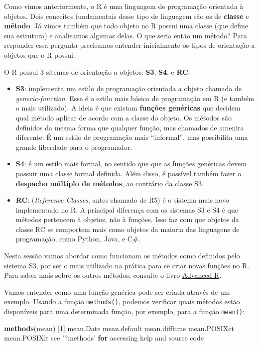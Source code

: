 \documentclass[10pt,a4paper]{book}
\newenvironment{Shaded}{\begin{snugshade}}{\end{snugshade}}
\newcommand{\KeywordTok}[1]{\textcolor[rgb]{0.13,0.29,0.53}{\textbf{#1}}}
\newcommand{\DecValTok}[1]{\textcolor[rgb]{0.00,0.00,0.81}{#1}}
\newcommand{\StringTok}[1]{\textcolor[rgb]{0.31,0.60,0.02}{#1}}
\newcommand{\ControlFlowTok}[1]{\textcolor[rgb]{0.13,0.29,0.53}{\textbf{#1}}}
\newcommand{\NormalTok}[1]{#1}
\providecommand{\tightlist}{%
  \setlength{\itemsep}{0pt}\setlength{\parskip}{0pt}}
\begin{document}
Como vimos anteriormente, o R é uma linguagem de programação orientada à
objetos. Dois conceitos fundamentais desse tipo de linguagem são os de
\textbf{classe} e \textbf{método}. Já vimos também que todo objeto no R
possui uma classe (que define sua estrutura) e analisamos algumas delas.
O que seria então um método? Para responder essa pergunta precisamos
entender inicialmente os tipos de orientação a objetos que o R possui.

O R possui 3 sitemas de orientação a objetos: \textbf{S3}, \textbf{S4},
e \textbf{RC}:

\begin{itemize}
\tightlist
\item
  \textbf{S3}: implementa um estilo de programação orientada a objeto
  chamada de \emph{generic-function}. Esse é o estilo mais básico de
  programação em R (e também o mais utilizado). A ideia é que existam
  \textbf{funções genéricas} que decidem qual método aplicar de acordo
  com a classe do objeto. Os métodos são definidos da mesma forma que
  qualquer função, mas chamados de amenira diferente. É um estilo de
  programação mais ``informal'', mas possibilita uma grande liberdade
  para o programador.
\item
  \textbf{S4}: é um estilo mais formal, no sentido que que as funções
  genéricas devem possuir uma classe formal definida. Além disso, é
  possível também fazer o \textbf{despacho múltiplo de métodos}, ao
  contrário da classe S3.
\item
  \textbf{RC}: (\emph{Reference Classes}, antes chamado de R5) é o
  sistema mais novo implementado no R. A principal diferença com os
  sistemas S3 e S4 é que métodos pertencem à objetos, não à funções.
  Isso faz com que objetos da classe RC se comportem mais como objetos
  da maioria das linguagens de programação, como Python, Java, e C\#.
\end{itemize}

Nesta sessão vamos abordar como funcionam os métodos como definidos pelo
sistema S3, por ser o mais utilizado na prática para se criar novas
funções no R. Para saber mais sobre os outros métodos, consulte o livro
\href{http://adv-r.had.co.nz/OO-essentials.html}{Advanced R}.

Vamos entender como uma função genérica pode ser criada através de um
exemplo. Usando a função \texttt{methods()}, podemos verificar quais
métodos estão disponíveis para uma determinada função, por exemplo, para
a função \texttt{mean()}:

\begin{Shaded}
\begin{Highlighting}[]
\KeywordTok{methods}\NormalTok{(mean)}
\NormalTok{[}\DecValTok{1}\NormalTok{] mean.Date     mean.default  mean.difftime mean.POSIXct  mean.POSIXlt }
\NormalTok{see }\StringTok{'?methods'} \ControlFlowTok{for}\NormalTok{ accessing help and source code}
\end{Highlighting}
\end{Shaded}
\end{document}
